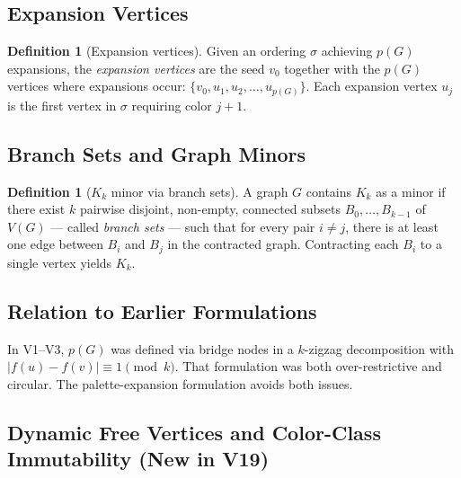\documentclass[12pt,a4paper]{article}
\theoremstyle{definition}
\newtheorem{definition}[theorem]{Definition}
\begin{document}
\subsection{Expansion Vertices}

\begin{definition}[Expansion vertices]
Given an ordering $\sigma$ achieving $p(G)$ expansions, the
\emph{expansion vertices} are the seed $v_0$ together with the $p(G)$
vertices where expansions occur:
$\{v_0, u_1, u_2, \ldots, u_{p(G)}\}$.
Each expansion vertex $u_j$ is the first vertex in $\sigma$ requiring
color $j+1$.
\end{definition}

\subsection{Branch Sets and Graph Minors}

\begin{definition}[$K_k$ minor via branch sets]
A graph $G$ contains $K_k$ as a minor if there exist $k$ pairwise
disjoint, non-empty, connected subsets $B_0, \ldots, B_{k-1}$ of $V(G)$
--- called \emph{branch sets} --- such that for every pair $i \neq j$,
there is at least one edge between $B_i$ and $B_j$ in the contracted
graph. Contracting each $B_i$ to a single vertex yields $K_k$.
\end{definition}

\subsection{Relation to Earlier Formulations}

In V1--V3, $p(G)$ was defined via bridge nodes in a $k$-zigzag
decomposition with $|f(u)-f(v)| \equiv 1 \pmod{k}$.
That formulation was both over-restrictive and circular.
The palette-expansion formulation avoids both issues.

\subsection{Dynamic Free Vertices and Color-Class Immutability (New in V19)}
\end{document}
